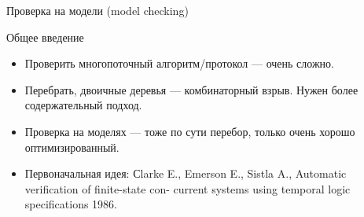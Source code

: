 \documentclass[aspectratio=169,dvipsnames,usenames]{beamer}
\begin{document}
\newtheorem{dfn}{Определение}[section]
\newtheorem{nte}{Замечание}[section]

\newtheorem{axiom}{Аксиома}[section]
\newtheorem{thm}{Теорема}[section]
\newtheorem{lmm}[theorem]{Лемма}
\newtheorem{statement}{Утверждение}[section]
\newtheorem{oun_paragraph}{Пункт}[section]
\newtheorem{cons}{Следствие}[section]
\newtheorem*{exm}{Пример}

\newcommand{\comb}[1]{\operatorname{\mathcal{#1}}}
\newcommand{\func}[1]{\operatorname{#1}}
\newcommand{\reduction}[1]{{\color{OrangeRed}#1}}
\newcommand{\set}[1]{\left\{#1\right\}}

\def\from#1{\par \parbox{0.7\textwidth}{\par \hfill\raggedleft \it #1}} 

\begin{frame}{}
\begin{center}
{\LARGE Проверка на модели (model checking)}
\end{center}
\end{frame}

\begin{frame}{Общее введение}
\begin{itemize}
\item Проверить многопоточный алгоритм/протокол --- очень сложно.
\item Перебрать, двоичные деревья --- комбинаторный взрыв. Нужен более содержательный подход.
\item Проверка на моделях --- тоже по сути перебор, только очень хорошо оптимизированный.
\item Первоначальная идея: Сlarke E., Emerson E., Sistla A., Automatic veriﬁcation of ﬁnite-state con-
                                                            current systems using temporal logic speciﬁcations 
1986.
\end{itemize}
\end{frame}
\end{document}

